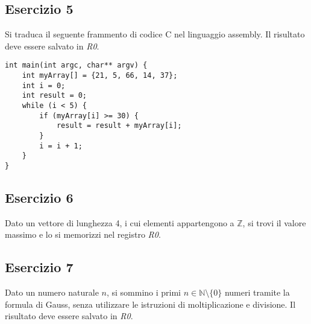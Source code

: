 \documentclass{article}
\begin{document}
\subsection*{Esercizio 5}
Si traduca il seguente frammento di codice C nel linguaggio assembly. Il risultato deve essere salvato in \textit{R0}.
\begin{lstlisting}
int main(int argc, char** argv) {
	int myArray[] = {21, 5, 66, 14, 37};
	int i = 0;
	int result = 0;
	while (i < 5) {
		if (myArray[i] >= 30) {
			result = result + myArray[i];
		}
		i = i + 1;
	}
}
\end{lstlisting}

\subsection*{Esercizio 6}
Dato un vettore di lunghezza 4, i cui elementi appartengono a $\mathbb{Z}$, si trovi il valore massimo e lo si memorizzi nel registro \textit{R0}.

\subsection*{Esercizio 7}
Dato un numero naturale $n$, si sommino i primi $n \in \mathbb{N} \setminus \{0\}$ numeri tramite la formula di Gauss, senza utilizzare le istruzioni di moltiplicazione e divisione. Il risultato deve essere salvato in \textit{R0}.
\end{document}
